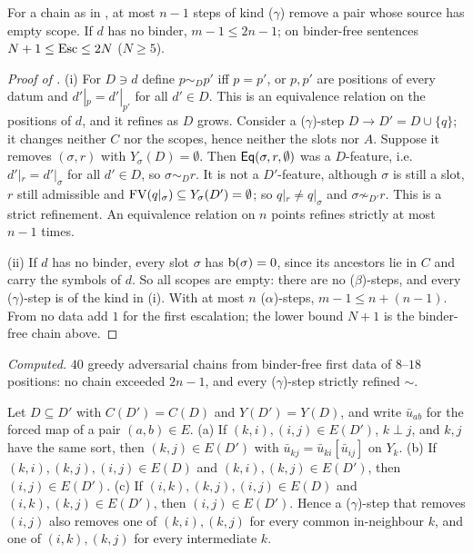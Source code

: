 \begin{proposition}\label{prop:single:binderfree}
For a chain as in , at most $n-1$ steps of kind ($\gamma$) remove a pair whose source has empty scope. If $d$ has no binder, $m-1\le2n-1$; on binder-free sentences $N+1\le\mathrm{Esc}\le2N$ ($N\ge5$).
\end{proposition}

\begin{proof}[Proof of ]
(i) For $D\ni d$ define $p\sim_Dp'$ iff $p=p'$, or $p,p'$ are positions of every datum and $d'|_p=d'|_{p'}$ for all $d'\in D$. This is an equivalence relation on the positions of $d$, and it refines as $D$ grows. Consider a ($\gamma$)-step $D\to D'=D\cup\{q\}$; it changes neither $C$ nor the scopes, hence neither the slots nor $A$. Suppose it removes $(\sigma,r)$ with $Y_\sigma(D)=\emptyset$. Then $\mathsf{Eq}(\sigma,r,\emptyset)$ was a $D$-feature, i.e.\ $d'|_r=d'|_\sigma$ for all $d'\in D$, so $\sigma\sim_Dr$. It is not a $D'$-feature, although $\sigma$ is still a slot, $r$ still admissible and $\mathrm{FV}(q|_\sigma)\subseteq Y_\sigma(D')=\emptyset$; so $q|_r\neq q|_\sigma$ and $\sigma\not\sim_{D'}r$. This is a strict refinement. An equivalence relation on $n$ points refines strictly at most $n-1$ times.

(ii) If $d$ has no binder, every slot $\sigma$ has $\mathrm{b}(\sigma)=0$, since its ancestors lie in $C$ and carry the symbols of $d$. So all scopes are empty: there are no ($\beta$)-steps, and every ($\gamma$)-step is of the kind in (i). With at most $n$ ($\alpha$)-steps, $m-1\le n+(n-1)$. From no data add $1$ for the first escalation; the lower bound $N+1$ is the binder-free chain above.
\end{proof}

\emph{Computed.} $40$ greedy adversarial chains from binder-free first data of $8$--$18$ positions: no chain exceeded $2n-1$, and every ($\gamma$)-step strictly refined $\sim$.

\begin{lemma}\label{lem:single:triangle}
Let $D\subseteq D'$ with $C(D')=C(D)$ and $Y(D')=Y(D)$, and write $\bar u_{ab}$ for the forced map of a pair $(a,b)\in E$.
(a) If $(k,i),(i,j)\in E(D')$, $k\perp j$, and $k,j$ have the same sort, then $(k,j)\in E(D')$ with $\bar u_{kj}=\bar u_{ki}[\bar u_{ij}]$ on $Y_k$.
(b) If $(k,i),(k,j),(i,j)\in E(D)$ and $(k,i),(k,j)\in E(D')$, then $(i,j)\in E(D')$.
(c) If $(i,k),(k,j),(i,j)\in E(D)$ and $(i,k),(k,j)\in E(D')$, then $(i,j)\in E(D')$.
Hence a ($\gamma$)-step that removes $(i,j)$ also removes one of $(k,i),(k,j)$ for every common in-neighbour $k$, and one of $(i,k),(k,j)$ for every intermediate $k$.
\end{lemma}

